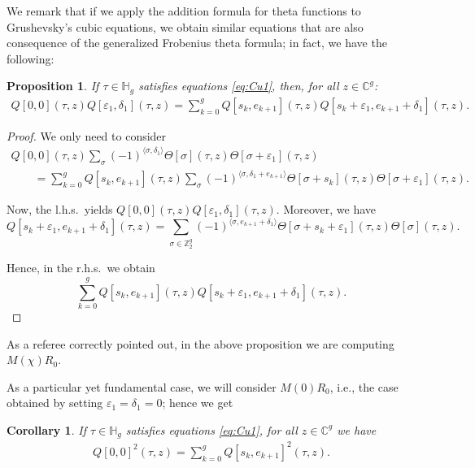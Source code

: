\documentclass[11pt]{article}
\numberwithin{equation}{section}
\numberwithin{equation}{section}
\newtheorem{Corollary}[Theorem]{Corollary}
\newtheorem{Proposition}[Theorem]{Proposition}
{ \theoremstyle{definition}
\newtheorem{Remark}[Theorem]{Remark} }
\newcommand{\de}{\delta}
\newcommand{\ep}{\varepsilon}
\newcommand{\CC}{{\mathbb{C}}}
\newcommand{\HH}{{\mathbb{H}}}
\newcommand{\ZZ}{{\mathbb{Z}}}
\def\ZZ{{\mathbb Z}}
\def\s{\sigma}
\def\T{\Theta}
\begin{document}
We remark that if we apply the addition formula for theta functions to Grushevsky's cubic equations, we obtain similar equations that are also consequence of the generalized Frobenius theta formula; in fact, we have the following:

\begin{Proposition}\label{statement:GF'} If $\tau\in \HH_g$ satisfies equations \eqref{eq:Cu1},
 then, for all $z\in \CC^g$:
\begin{gather}\label{eq:RF2a}
 Q[0, 0] (\tau, z)Q[\ep_1, \de_1 ] (\tau, z)=\sum_{k=0}^g Q[s_k, e_{k+1}] (\tau, z)Q[s_k+\ep_1, e_{k+1}+\de_1] (\tau, z) .
\end{gather}
\end{Proposition}

\begin{proof} We only need to consider
\begin{gather*}
Q[0,0](\tau, z)\sum_{ \s} (-1)^{\langle \s,\de_1\rangle}\T[\s](\tau,z)\T[\s+\ep_1](\tau,z)\\
\qquad{}= \sum_{k=0}^g Q[s_k, e_{k+1}](\tau, z)\sum_{ \s} (-1)^{\langle \s,\de_1+e_{k+1}\rangle}
\T[\s+s_k](\tau,z)\T[\s+\ep_1](\tau,z).
\end{gather*}

Now, the l.h.s.\ yields $ Q[0, 0](\tau, z)Q[\ep_1, \de_1 ] (\tau, z)$. Moreover, we have
\[
Q[s_k+\ep_1, e_{k+1}+\de_1](\tau, z)= \sum_{\s \in\ZZ_2^g} (-1)^{\langle\s, e_{k+1} +\de_1\rangle} \T[\s+s_k+\ep_1](\tau,z)\T[\s](\tau,z).
\]

Hence, in the r.h.s.\ we obtain
\[
\sum_{k=0}^g Q[s_k, e_{k+1}] (\tau, z)Q[s_k+\ep_1, e_{k+1}+\de_1] (\tau, z).\tag*{\qed}
\]\renewcommand{\qed}{}
\end{proof}

\begin{Remark} As a referee correctly pointed out, in the above proposition we are computing $M(\chi)R_0$. \end{Remark}

As a particular yet fundamental case, we will consider $M(0)R_0$, i.e., the case obtained by setting $\ep_1=\de_1=0$; hence we get

\begin{Corollary}\label{statement:GF} If $\tau\in \HH_g$ satisfies equations \eqref{eq:Cu1}, for all $z\in \CC^g$ we have
\begin{gather}\label{eq:RF}
 Q[0, 0]^2(\tau, z)=\sum_{k=0}^g Q[s_k, e_{k+1}]^2(\tau, z).
\end{gather}
\end{Corollary}
\end{document}
